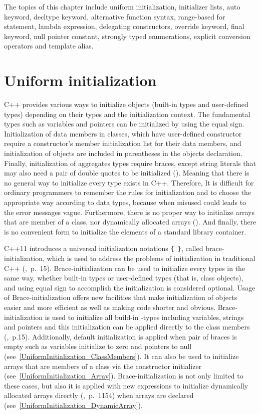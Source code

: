 \documentclass[11pt]{report}
\begin{document}
The topics of this chapter include uniform initialization, initializer lists, auto keyword, decltype keyword, alternative function syntax, range-based for statement, lambda expression, delegating constructors, override keyword, final keyword, null pointer constant, strongly typed enumerations, explicit conversion operators and template alias.

\section{Uniform initialization}
\label{section:Uniform initialization}
C++ provides various ways to initialize objects (built-in types and user-defined types) depending on their types and the initialization context. The fundamental types such as variables and pointers can be initialized by using the equal sign. Initialization of data members in classes, which have user-defined constructor require a constructor's member initialization list for their data members, and initialization of objects are included in parentheses in the objects declaration. Finally, initialization of aggregates types require braces, except string literals that may also need a pair of double quotes to be initialized  (\cite{Stroustrup:2012:Cpp11}). Meaning that there is no general way to initialize every type exists in C++. Therefore, It is difficult for ordinary programmers to remember the rules for initialization and to choose the appropriate way according to data types, because when misused could leads to the error messages vague. Furthermore, there is no proper way to initialize arrays that are member of a class, nor dynamically allocated arrays (\cite{Stroustrup:2012:Cpp11}). And finally, there is no convenient form to initialize the elements of a standard library container.

C++11 introduces a universal initialization notations \texttt{\{ \}}, called brace-initialization, which is used to address the problems of initialization in traditional C++ (\cite{Reddy:2011:API},~p.~15). Brace-initialization can be used to initialize every types in the same way, whether built-in types or user-defined types (that is, class objects), and using equal sign to accomplish the initialization is considered optional. Usage of Brace-initialization offers new facilities that make initialization of objects easier and more efficient as well as making code shorter and obvious.
Brace-initialization is used to initialize all build-in -types including variables, strings and pointers and this initialization can be applied directly to the class members (\cite{Reddy:2011:API},~p.15). Additionally, default initialization is applied when pair of braces is empty such as variables initialize to zero and pointers to null (see~\ref{UniformInitialization_ClassMembers}). It can also be used to initialize arrays that are members of a class via the constructor initializer (see~\ref{UniformInitialization_Array}). Brace-initialization is not only limited to these cases, but also it is applied with new expressions to initialize dynamically allocated arrays directly (\cite{Prata:2012:Cpp},~p.~1154) when arrays are declared (see~\ref{UniformInitialization_DynamicArray}).
\end{document}

